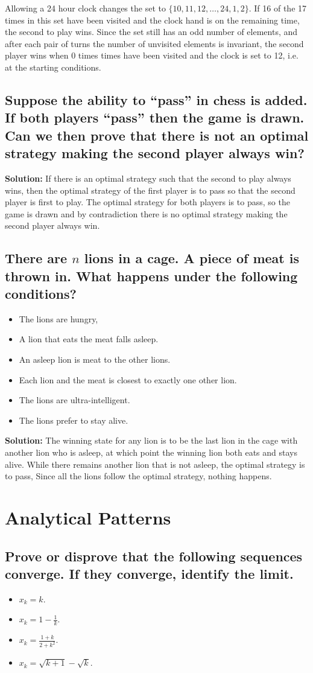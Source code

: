 \documentclass{article}
\newcommand{\exercise}[1]{\subsection{\normalfont #1}}
\newcommand{\solution}{\indent\indent \textbf{Solution: }}
\begin{document}
 \indent Allowing a 24 hour clock changes the set to $\{10, 11, 12, \dots, 24, 1, 2\}$. If 16 of the 17 times in this set have been visited and the clock hand is on the remaining time, the second to play wins. Since the set still has an odd number of elements, and after each pair of turns the number of unvisited elements is invariant, the second player wins when 0 times times have been visited and the clock is set to 12, i.e. at the starting conditions. 
 
 \exercise{Suppose the ability to ``pass'' in chess is added. If both players ``pass'' then the game is drawn. Can we then prove that there is not an optimal strategy making the second player always win?} %
 \solution If there is an optimal strategy such that the second to play always wins, then the optimal strategy of the first player is to pass so that the second player is first to play. The optimal strategy for both players is to pass, so the game is drawn and by contradiction there is no optimal strategy making the second player always win.
 \exercise{There are $n$ lions in a cage. A piece of meat is thrown in. What happens under the following conditions?} %
 \begin{itemize}
 \item The lions are hungry,
 \item A lion that eats the meat falls asleep.
 \item An asleep lion is meat to the other lions.
 \item Each lion and the meat is closest to exactly one other lion.
 \item The lions are ultra-intelligent.
 \item The lions prefer to stay alive.
 \end{itemize}
 \solution The winning state for any lion is to be the last lion in the cage with another lion who is asleep, at which point the winning lion both eats and stays alive. While there remains another lion that is not asleep, the optimal strategy is to pass, Since all the lions follow the optimal strategy, nothing happens. 
 
 \newpage
 \section{Analytical Patterns} 
 \exercise{Prove or disprove that the following sequences converge. If they converge, identify the limit.}%
 \begin{itemize}
 \item $x_k = k$.
 \item $x_k = 1-\frac{1}{k}$.
 \item $x_k = \frac{1+k}{2+k^2}.$
 \item $x_k = \sqrt{k+1} - \sqrt{k}$.
 \end{itemize}
 
\end{document}
